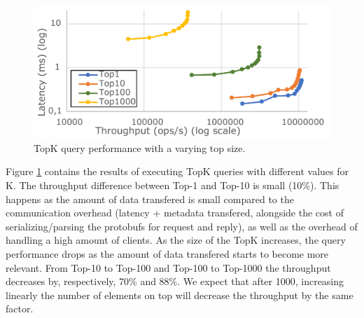 \documentclass[sigplan,10pt]{acmart}
\newcommand{\andre}[1]{\nbnote{Andre}{blue}{#1}}
\begin{document}
\begin{figure}
	\centering
	\includegraphics[width=.7\linewidth]{TopKTopSize0upd_cut}
	\caption{TopK query performance with a varying top size.}
	\label{fig:TopkSize0upd}
\end{figure}

Figure \ref{fig:TopkSize0upd} contains the results of executing TopK queries with different values for K.
The throughput difference between Top-1 and Top-10 is small (10\%). This happens as the amount of data transfered is small compared to the communication overhead (latency + metadata transfered, alongside the cost of serializing/parsing the protobufs for request and reply), as well as the overhead of handling a high amount of clients.
As the size of the TopK increases, the query performance drops as the amount of data transfered starts to become more relevant.
From Top-10 to Top-100 and Top-100 to Top-1000 the throughput decreases by, respectively, 70\% and 88\%.
We expect that after 1000, increasing linearly the number of elements on top will decrease the throughput by the same factor.
\end{document}
